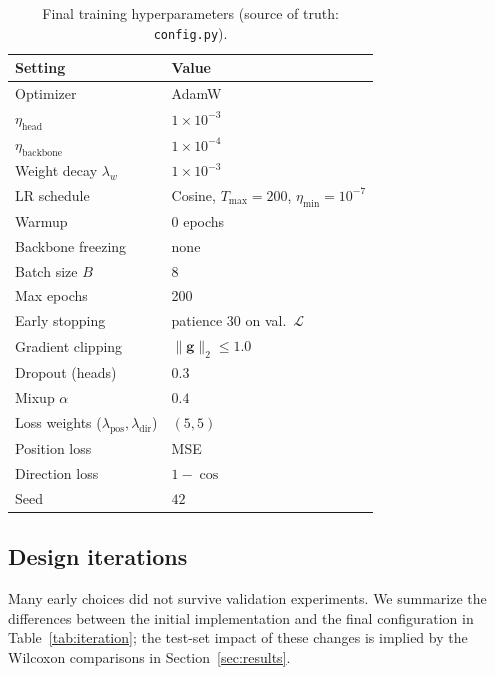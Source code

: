 \documentclass[conference,10pt,letterpaper]{IEEEtran}
\begin{document}
\begin{table}[t]
\caption{Final training hyperparameters (source of truth: \texttt{config.py}).}
\label{tab:hparams}
\centering
\renewcommand{\arraystretch}{1.15}
\begin{tabular}{ll}
\toprule
\textbf{Setting} & \textbf{Value}\\
\midrule
Optimizer & AdamW~\cite{loshchilov2019adamw}\\
$\eta_\text{head}$            & $1{\times}10^{-3}$\\
$\eta_\text{backbone}$        & $1{\times}10^{-4}$\\
Weight decay $\lambda_w$      & $1{\times}10^{-3}$\\
LR schedule                   & Cosine, $T_\text{max}{=}200$, $\eta_\text{min}{=}10^{-7}$\\
Warmup                        & 0 epochs\\
Backbone freezing             & none\\
Batch size $B$                & 8\\
Max epochs                    & 200\\
Early stopping                & patience 30 on val.\ $\mathcal{L}$\\
Gradient clipping             & $\|\mathbf{g}\|_2\le 1.0$\\
Dropout (heads)               & $0.3$\\
Mixup $\alpha$                & $0.4$\\
Loss weights ($\lambda_\text{pos},\lambda_\text{dir}$) & $(5,5)$\\
Position loss                 & MSE\\
Direction loss                & $1-\cos$\\
Seed                          & $42$\\
\bottomrule
\end{tabular}
\end{table}

\subsection{Design iterations}
Many early choices did not survive validation experiments. We summarize
the differences between the initial implementation and the final
configuration in Table~\ref{tab:iteration}; the test-set impact of these
changes is implied by the Wilcoxon comparisons in
Section~\ref{sec:results}.
\end{document}
